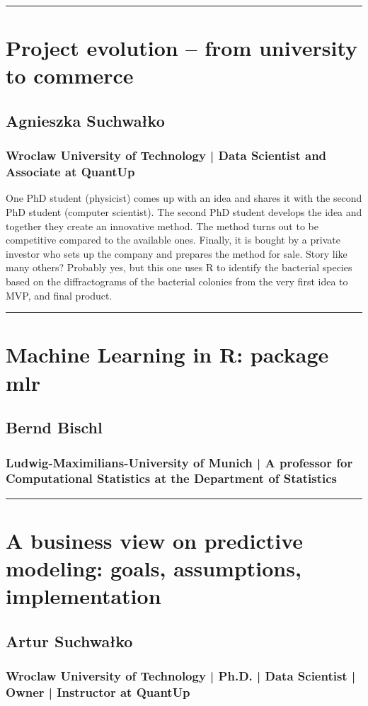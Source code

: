 \documentclass [12pt]{article}
\begin{document}
\noindent\rule{\textwidth}{1pt}
\section{Project evolution -- from university to commerce}
\subsection*{Agnieszka Suchwałko}
\subsubsection*{Wroclaw University of Technology | Data Scientist and Associate at QuantUp}

One PhD student (physicist) comes up with an idea and shares it with the second PhD student (computer scientist). The second PhD student develops the idea and together they create an innovative method. The method turns out to be competitive compared to the available ones. Finally, it is bought by a private investor who sets up the company and prepares the method for sale. Story like many others? Probably yes, but this one uses R to identify the bacterial species based on the diffractograms of the bacterial colonies from the very first idea to MVP, and final product.

\noindent\rule{\textwidth}{1pt}
\section{Machine Learning in R: package mlr} 
\subsection*{Bernd Bischl}
\subsubsection*{Ludwig-Maximilians-University of Munich | A professor for Computational Statistics at the Department of Statistics}

\noindent\rule{\textwidth}{1pt}
\section{A business view on predictive modeling: goals, assumptions, implementation}
\subsection*{Artur Suchwałko}
\subsubsection*{Wroclaw University of Technology | Ph.D. | Data Scientist | Owner | Instructor at QuantUp}
\end{document}
